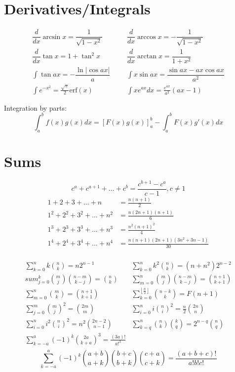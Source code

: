 \section{Derivatives/Integrals}
\begin{align*}
	\dfrac{d}{dx}\arcsin x = \dfrac{1}{\sqrt{1-x^2}} &&& \dfrac{d}{dx}\arccos x = -\dfrac{1}{\sqrt{1-x^2}} \\
	\dfrac{d}{dx}\tan x = 1+\tan^2 x &&& \dfrac{d}{dx}\arctan x = \dfrac{1}{1+x^2} \\
	\int\tan ax = -\dfrac{\ln|\cos ax|}{a} &&& \int x\sin ax = \dfrac{\sin ax-ax \cos ax}{a^2} \\
	\int e^{-x^2} = \frac{\sqrt \pi}{2} \text{erf}(x) &&& \int xe^{ax}dx = \frac{e^{ax}}{a^2}(ax-1)
\end{align*}

Integration by parts:
\[\int_a^bf(x)g(x)dx = [F(x)g(x)]_a^b-\int_a^bF(x)g'(x)dx\]

\section{Sums}
\[ c^a + c^{a+1} + \dots + c^{b} = \frac{c^{b+1} - c^a}{c-1}, c \neq 1 \]
\begin{align*}
	1 + 2 + 3 + \dots + n &= \frac{n(n+1)}{2} \\
	1^2 + 2^2 + 3^2 + \dots + n^2 &= \frac{n(2n+1)(n+1)}{6} \\
	1^3 + 2^3 + 3^3 + \dots + n^3 &= \frac{n^2(n+1)^2}{4} \\
	1^4 + 2^4 + 3^4 + \dots + n^4 &= \frac{n(n+1)(2n+1)(3n^2 + 3n - 1)}{30} \\
\end{align*}

\[\begin{array}{ll}
\sum_{k=0}^{n} k\binom{n}{k} = n2^{n-1} & \sum_{k=0}^{n} k^2\binom{n}{k} = (n+n^2)2^{n-2} \\                      
sum_{j=0}^{k} \binom{m}{j}\binom{n-m}{k-j} = \binom{n}{k} & \sum_{m=0}^{n} \binom{m}{j}\binom{n-m}{k-j} = \binom{n+1}{k+1} \\
\sum_{m=0}^{n} \binom{m}{k} = \binom{n+1}{k+1} & \sum_{k=0}^{\left \lfloor \frac{n}{2} \right \rfloor} \binom{n-k}{k} = F(n+1) \\
\sum_{j=0}^{m}\binom{m}{j}^2=\binom{2m}{m} & \sum_{i=0}^{n}i\binom{n}{i}^2=\frac{n}{2}\binom{2n}{n} \\
\sum_{i=0}^{n}i^2\binom{n}{i}^2=n^2\binom{2n-2}{n-1} & \sum_{k=q}^{n}\binom{n}{k}\binom{k}{q}=2^{n-q}\binom{n}{q} \\
\sum_{k=-a}^{a}(-1)^k\binom{2a}{k+a}^3=\frac{(3a)!}{a!^3} \\
\end{array}\]
\[\sum_{k=-a}^{a}(-1)^k\binom{a+b}{a+k}\binom{b+c}{b+k}\binom{c+a}{c+k}=\frac{(a+b+c)!}{a!b!c!}\]

